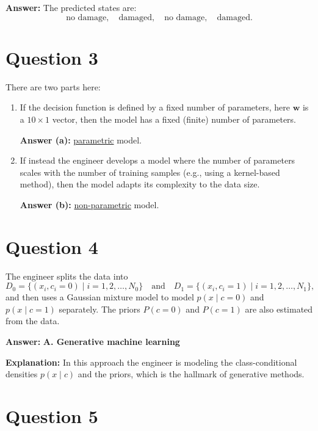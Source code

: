 \documentclass[12pt]{article}
\begin{document}
\textbf{Answer:} The predicted states are:
\[
\text{no damage},\quad \text{damaged},\quad \text{no damage},\quad \text{damaged}.
\]

\bigskip

\section*{Question 3}

There are two parts here:

\begin{enumerate}[label=(\alph*)]
    \item If the decision function is defined by a fixed number of parameters, here \(\bm{w}\) is a \(10\times 1\) vector, then the model has a fixed (finite) number of parameters.
    
    \textbf{Answer (a):} \underline{parametric} model.
    
    \item If instead the engineer develops a model where the number of parameters scales with the number of training samples (e.g., using a kernel-based method), then the model adapts its complexity to the data size.
    
    \textbf{Answer (b):} \underline{non-parametric} model.
\end{enumerate}

\bigskip

\section*{Question 4}

The engineer splits the data into
\[
D_0 = \{(x_i, c_i = 0) \mid i = 1, 2, \ldots, N_0\} \quad \text{and} \quad D_1 = \{(x_i, c_i = 1) \mid i = 1, 2, \ldots, N_1\},
\]
and then uses a Gaussian mixture model to model \(p(x\mid c=0)\) and \(p(x\mid c=1)\) separately. The priors \(P(c=0)\) and \(P(c=1)\) are also estimated from the data.

\textbf{Answer:} \textbf{A. Generative machine learning}

\textbf{Explanation:} In this approach the engineer is modeling the class-conditional densities \(p(x\mid c)\) and the priors, which is the hallmark of generative methods.

\bigskip

\section*{Question 5}
\end{document}
